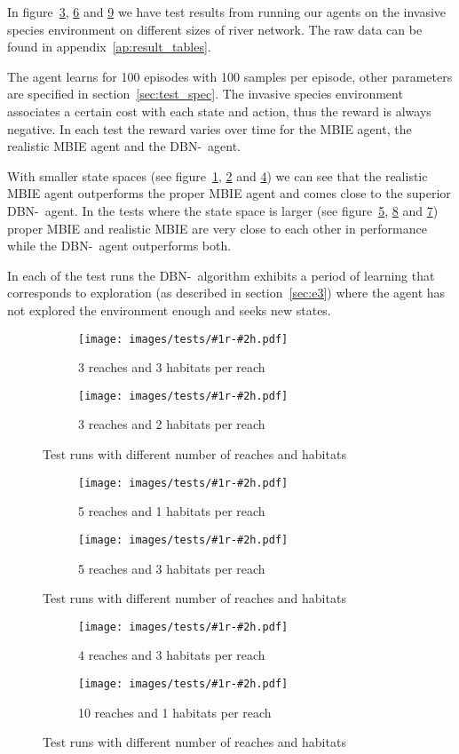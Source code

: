 In figure~\ref{fig:tests1}, \ref{fig:tests2} and \ref{fig:tests3} we have test results from running our agents on the invasive species environment on different sizes of river network. The raw data can be found in appendix~\ref{ap:result_tables}.

The agent learns for 100 episodes with 100 samples per episode, other parameters are specified in section~\ref{sec:test_spec}. The invasive species environment associates a certain cost with each state and action, thus the reward is always negative. In each test the reward varies over time for the MBIE agent, the realistic MBIE agent and the DBN-\etre\ agent.

With smaller state spaces (see figure~\ref{fig:3r3h}, \ref{fig:3r2h} and \ref{fig:5r1h}) we can see that the realistic MBIE agent outperforms the proper MBIE agent and comes close to the superior DBN-\etre\ agent. In the tests where the state space is larger (see figure~\ref{fig:5r3h}, \ref{fig:10r1h} and \ref{fig:4r3h}) proper MBIE and realistic MBIE are very close to each other in performance while the DBN-\etre\ agent outperforms both.

In each of the test runs the DBN-\etre\ algorithm exhibits a period of learning that corresponds to exploration (as described in section~\ref{sec:e3}) where the agent has not explored the environment enough and seeks new states.

\newcommand{\graphwidth}{0.47\textwidth}
\newcommand{\testsubfigure}[2]{%
\begin{subfigure}[b]{\graphwidth}
    \texttt{[image: images/tests/\#1r-\#2h.pdf]}
    \caption{#1 reaches and #2 habitats per reach}
    \label{fig:#1r#2h}
\end{subfigure}
}

\begin{figure}[H]
    \centering
    \testsubfigure{3}{3}
    \quad
    \testsubfigure{3}{2}
    \caption{Test runs with different number of reaches and habitats}
    \label{fig:tests1}
\end{figure}

\begin{figure}[H]
    \centering
    \testsubfigure{5}{1}
    \quad
    \testsubfigure{5}{3}
    \caption{Test runs with different number of reaches and habitats}
    \label{fig:tests2}
\end{figure}

\begin{figure}[H]
    \centering
    \testsubfigure{4}{3}
    \quad
    \testsubfigure{10}{1}
    \caption{Test runs with different number of reaches and habitats}
    \label{fig:tests3}
\end{figure}